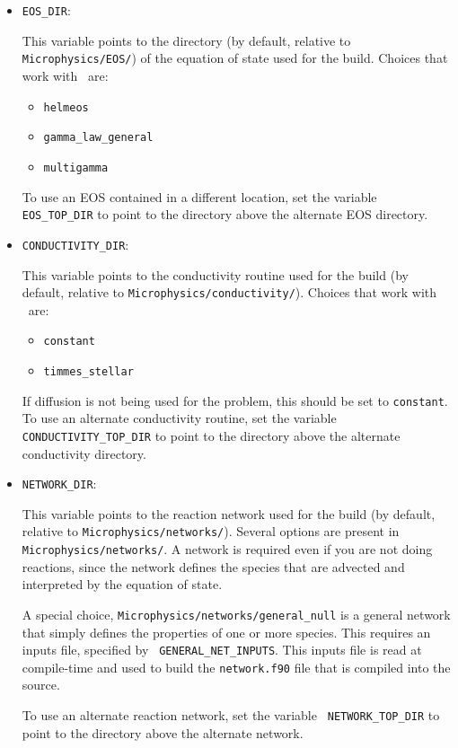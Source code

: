\begin{itemize}
\item {\tt EOS\_DIR}:

  This variable points to the directory (by default, relative to {\tt
  Microphysics/EOS/}) of the equation of state used for the build.
  Choices that work with \maestro\ are:
  \begin{itemize}
  \item {\tt helmeos}
  \item {\tt gamma\_law\_general}
  \item {\tt multigamma}
  \end{itemize}
  To use an EOS contained in a different location, set the variable {\tt
  EOS\_TOP\_DIR} to point to the directory above the alternate EOS
  directory.

\item {\tt CONDUCTIVITY\_DIR}:

  This variable points to the conductivity routine used for the build
  (by default, relative to {\tt Microphysics/conductivity/}).  Choices
  that work with \maestro\ are: 
  \begin{itemize} 
  \item {\tt constant} 
  \item {\tt timmes\_stellar} 
  \end{itemize} 
  If diffusion is not being used for the problem, this should be set
  to {\tt constant}.  To use an alternate conductivity
  routine, set the variable {\tt CONDUCTIVITY\_TOP\_DIR} to point
  to the directory above the alternate conductivity directory.

\item {\tt NETWORK\_DIR}:

  This variable points to the reaction network used for the build (by
  default, relative to {\tt Microphysics/networks/}).  Several options
  are present in {\tt Microphysics/networks/}.  A network is required even
  if you are not doing reactions, since the network defines the
  species that are advected and interpreted by the equation of state.

  A special choice, {\tt Microphysics/networks/general\_null} is a general
  network that simply defines the properties of one or more species.
  This requires an inputs file, specified by {\tt
  GENERAL\_NET\_INPUTS}.  This inputs file is read at compile-time and
  used to build the {\tt network.f90} file that is compiled into the
  source.

  To use an alternate reaction network, set the variable {\tt
  NETWORK\_TOP\_DIR} to point to the directory above the alternate
  network.

\end{itemize}


